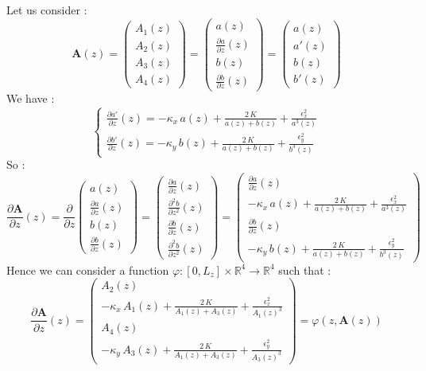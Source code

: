 \documentclass[10pt]{article}
\newcommand{\D}{{\partial}}
\begin{document}
Let us consider :
$$
\mathbf{A}(z) = \left(\begin{array}{c}
  A_1(z) \\ A_2(z) \\ A_3(z) \\ A_4(z)
    \end{array}\right)
  = \left(\begin{array}{c}
  a(z) \\ \frac{\D a}{\D z}(z) \\ b(z) \\ \frac{\D b}{\D z}(z)
    \end{array}\right)
  = \left(\begin{array}{c}
  a(z) \\ a'(z) \\ b(z) \\ b'(z)
    \end{array}\right)
$$
We have :
$$
\left\lbrace
    \begin{array}{ll}
\frac{\D a'}{\D z}(z) = - \kappa_{x}\,a(z) + \frac{2\,K}{a(z)+b(z)} + \frac{\epsilon_{x}^2}{a^3(z)} \\
\frac{\D b'}{\D z}(z) = - \kappa_{y}\,b(z) + \frac{2\,K}{a(z)+b(z)} + \frac{\epsilon_{y}^2}{b^3(z)}
    \end{array}
\right.
$$
So :
$$
\frac{\D \mathbf{A}}{\D z}(z) = \frac{\D}{\D z} \left(\begin{array}{c}
  a(z) \\ \frac{\D a}{\D z}(z) \\ b(z) \\ \frac{\D b}{\D z}(z) \end{array}\right) = \left(\begin{array}{c}
  \frac{\D a}{\D z}(z) \\ \frac{\D^{2} b}{\D z^2}(z) \\ \frac{\D b}{\D z}(z) \\ \frac{\D^{2} b}{\D z^2}(z) \end{array}\right)
= \left(\begin{array}{c}
  \frac{\D a}{\D z}(z) \\ - \kappa_{x}\,a(z) + \frac{2\,K}{a(z)+b(z)} + \frac{\epsilon_{x}^2}{a^3(z)} \\ \frac{\D b}{\D z}(z) \\ - \kappa_{y}\,b(z) + \frac{2\,K}{a(z)+b(z)} + \frac{\epsilon_{y}^2}{b^3(z)} \end{array}\right)
$$
Hence we can consider a function $\varphi : [0,L_z]\times\mathbb{R}^4\to\mathbb{R}^4$ such that : \\
$$\boxed{
\displaystyle \frac{\D \mathbf{A}}{\D z}(z) = \left(\begin{array}{c}
  A_2(z) \\ - \kappa_{x}\,A_1(z) + \frac{2\,K}{A_1(z)+A_3(z)} + \frac{\epsilon_{x}^2}{A_1(z)^3} \\ A_4(z) \\ - \kappa_{y}\,A_3(z) + \frac{2\,K}{A_1(z)+A_3(z)} + \frac{\epsilon_{y}^2}{A_3(z)^3} \end{array}\right)
  = \varphi\left(z,\mathbf{A}(z)\right)}
$$
\end{document}
